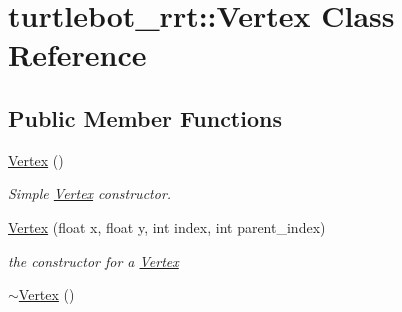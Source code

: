 \hypertarget{classturtlebot__rrt_1_1Vertex}{}\section{turtlebot\+\_\+rrt\+:\+:Vertex Class Reference}
\label{classturtlebot__rrt_1_1Vertex}
\subsection*{Public Member Functions}
\begin{DoxyCompactItemize}
\item 
\hyperlink{classturtlebot__rrt_1_1Vertex_a08a9a7531fe92edd3618661deb182a1c}{Vertex} ()\hypertarget{classturtlebot__rrt_1_1Vertex_a08a9a7531fe92edd3618661deb182a1c}{}\label{classturtlebot__rrt_1_1Vertex_a08a9a7531fe92edd3618661deb182a1c}

\begin{DoxyCompactList}\small\item\em Simple \hyperlink{classturtlebot__rrt_1_1Vertex}{Vertex} constructor. \end{DoxyCompactList}\item 
\hyperlink{classturtlebot__rrt_1_1Vertex_aa613d6a7411e6b4317711d928ab4a9c5}{Vertex} (float x, float y, int index, int parent\+\_\+index)
\begin{DoxyCompactList}\small\item\em the constructor for a \hyperlink{classturtlebot__rrt_1_1Vertex}{Vertex} \end{DoxyCompactList}\item 
\hyperlink{classturtlebot__rrt_1_1Vertex_ab3159441d4b9dff836fa895b8d7f0081}{$\sim$\+Vertex} ()\hypertarget{classturtlebot__rrt_1_1Vertex_ab3159441d4b9dff836fa895b8d7f0081}{}\label{classturtlebot__rrt_1_1Vertex_ab3159441d4b9dff836fa895b8d7f0081}


\end{DoxyCompactItemize}
